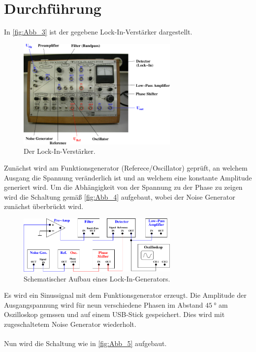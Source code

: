 \section{Durchführung}
\label{sec:Durchführung}

In \autoref{fig:Abb_3} ist der gegebene Lock-In-Verstärker dargestellt.
\begin{figure}[H]
    \centering
    \includegraphics[width=0.7\textwidth]{build/Abb_3.pdf}
    \caption {Der Lock-In-Verstärker.\cite{V303}}
    \label{fig:Abb_3}
\end{figure}
Zunächst wird am Funktionsgenerator (Referece/Oscillator) geprüft, an welchem Ausgang die Spannung veränderlich ist und an welchem eine konstante Amplitude generiert wird.
Um die Abhängigkeit von der Spannung zu der Phase zu zeigen wird die Schaltung gemäß \autoref{fig:Abb_4} aufgebaut, wobei der Noise Generator zunächst überbrückt wird.
\begin{figure}[H]
    \centering
    \includegraphics[width=0.7\textwidth]{build/Abb_4.pdf}
    \caption {Schematischer Aufbau eines Lock-In-Generators.\cite{V303}}
    \label{fig:Abb_4}
\end{figure}
Es wird ein Sinussignal mit dem Funktionsgenerator erzeugt.
Die Amplitude der Ausgangspannung wird für neun verschiedene Phasen im Abstand $\qty{45}{\degree}$ am Oszilloskop gemssen und auf einem USB-Stick gespeichert.
Dies wird mit zugeschaltetem Noise Generator wiederholt.\\
\\
Nun wird die Schaltung wie in \autoref{fig:Abb_5} aufgebaut.
